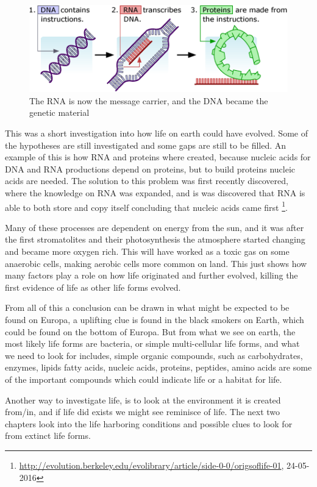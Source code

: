 \begin{figure}[htb]
  \centering
  \includegraphics[width=\textwidth]{figures/Life/dnarnaprotein}
  \caption{The RNA is now the message carrier, and the DNA became the genetic material}
\end{figure}

This was a short investigation into how life on earth could have evolved. Some of the hypotheses are still investigated and some gaps are still to be filled. An example of this is how RNA and proteins where created, because nucleic acids for DNA and RNA productions depend on proteins, but to build proteins nucleic acids are needed. The solution to this problem was first recently discovered, where the knowledge on RNA was expanded, and is was discovered that RNA is able to both store and copy itself concluding that nucleic acids came first \footnote{\url{http://evolution.berkeley.edu/evolibrary/article/side-0-0/origsoflife-01}, 24-05-2016}.

Many of these processes are dependent on energy from the sun, and it was after the first stromatolites and their photosynthesis the atmosphere started changing and became more oxygen rich. This will have worked as a toxic gas on some anaerobic cells, making aerobic cells more common on land. This just shows how many factors play a role on how life originated and further evolved, killing the first evidence of life as other life forms evolved.

From all of this a conclusion can be drawn in what might be expected to be found on Europa, a uplifting clue is found in the black smokers on Earth, which could be found on the bottom of Europa. But from what we see on earth, the most likely life forms are bacteria, or simple multi-cellular life forms, and what we need to look for includes, simple organic compounds, such as carbohydrates, enzymes, lipids fatty acids, nucleic acids, proteins, peptides, amino acids are some of the important compounds which could indicate life or a habitat for life.

Another way to investigate life, is to look at the environment it is created from/in, and if life did exists we might see reminisce of life. The next two chapters look into the life harboring conditions and possible clues to look for from extinct life forms.

